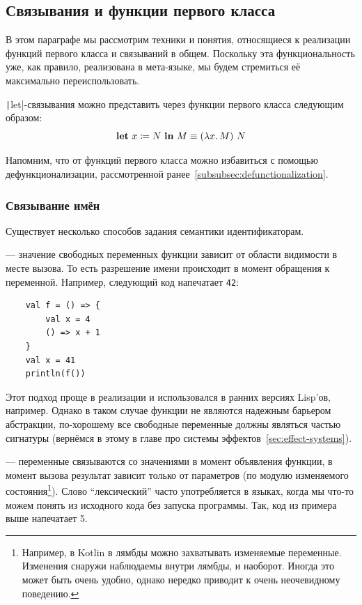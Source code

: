 \subsection{Связывания и функции первого класса} \label{subsec:first-class-functions}

В этом параграфе мы рассмотрим техники и понятия, относящиеся к реализации функций первого класса и связываний в общем.
Поскольку эта функциональность уже, как правило, реализована в мета-языке, мы будем стремиться её максимально переиспользовать.

\texttt|let|-связывания можно представить через функции первого класса следующим образом:
\[
    \mathbf{let} ~ x \coloneqq N ~ \mathbf{in} ~ M \equiv (\lambda x\ldotp M) ~ N
\]

Напомним, что от функций первого класса можно избавиться с помощью дефункционализации, рассмотренной ранее~\ref{subsubsec:defunctionalization}.

\subsubsection{Связывание имён} \label{subsubsec:name-bindings}

Существует несколько способов задания семантики идентификаторам.

 --- значение свободных переменных функции зависит от области видимости в месте вызова.
То есть разрешение имени происходит в момент обращения к переменной.
Например, следующий код напечатает \texttt{42}:
\begin{verbatim}
    val f = () => {
        val x = 4
        () => x + 1
    }
    val x = 41
    println(f())
\end{verbatim}

Этот подход проще в реализации и использовался в ранних версиях Lisp'ов, например.
Однако в таком случае функции не являются надежным барьером абстракции, по-хорошему все свободные переменные должны являться частью сигнатуры (вернёмся в этому в главе про системы эффектов~\ref{sec:effect-systems}).

 --- переменные связываются со значениями в момент объявления функции, в момент вызова результат зависит только от параметров (по модулю изменяемого состояния\footnote{Например, в Kotlin в лямбды можно захватывать изменяемые переменные. Изменения снаружи наблюдаемы внутри лямбды, и наоборот. Иногда это может быть очень удобно, однако нередко приводит к очень неочевидному поведению.}).
Слово ``лексический'' часто употребляется в языках, когда мы что-то можем понять из исходного кода без запуска программы.
Так, код из примера выше напечатает 5.

